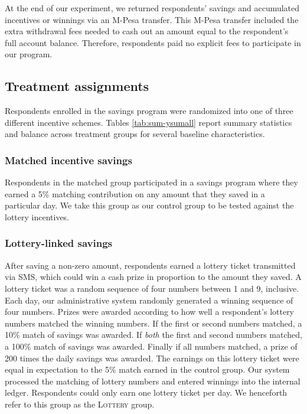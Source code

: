 \documentclass[11pt]{article}
\begin{document}
		At the end of our experiment, we returned respondents' savings and accumulated incentives or winnings via an M-Pesa transfer. This M-Pesa transfer included the extra withdrawal fees needed to cash out an amount equal to the respondent's full account balance. Therefore, respondents paid no explicit fees to participate in our program.

	\subsection{Treatment assignments}

		Respondents enrolled in the savings program were randomized into one of three different incentive schemes. Tables \ref{tab:sum-ysumall} report summary statistics and balance across treatment groups for several baseline characteristics.

			\subsubsection{Matched incentive savings}

				Respondents in the matched group participated in a savings program where they earned a 5\% matching contribution on any amount that they saved in a particular day. We take this group as our control group to be tested against the lottery incentives.

			\subsubsection{Lottery-linked savings}

				After saving a non-zero amount, respondents earned a lottery ticket transmitted via SMS, which could win a cash prize in proportion to the amount they saved. A lottery ticket was a random sequence of four numbers between 1 and 9, inclusive. Each day, our administrative system randomly generated a winning sequence of four numbers. Prizes were awarded according to how well a respondent's lottery numbers matched the winning numbers. If the first or second numbers matched, a 10\% match of savings was awarded. If \emph{both} the first and second numbers matched, a 100\% match of savings was awarded. Finally if all numbers matched, a prize of 200 times the daily savings was awarded. The earnings on this lottery ticket were equal in expectation to the 5\% match earned in the control group. Our system processed the matching of lottery numbers and entered winnings into the internal ledger. Respondents could only earn one lottery ticket per day. We henceforth refer to this group as the \textsc{Lottery} group.
\end{document}
